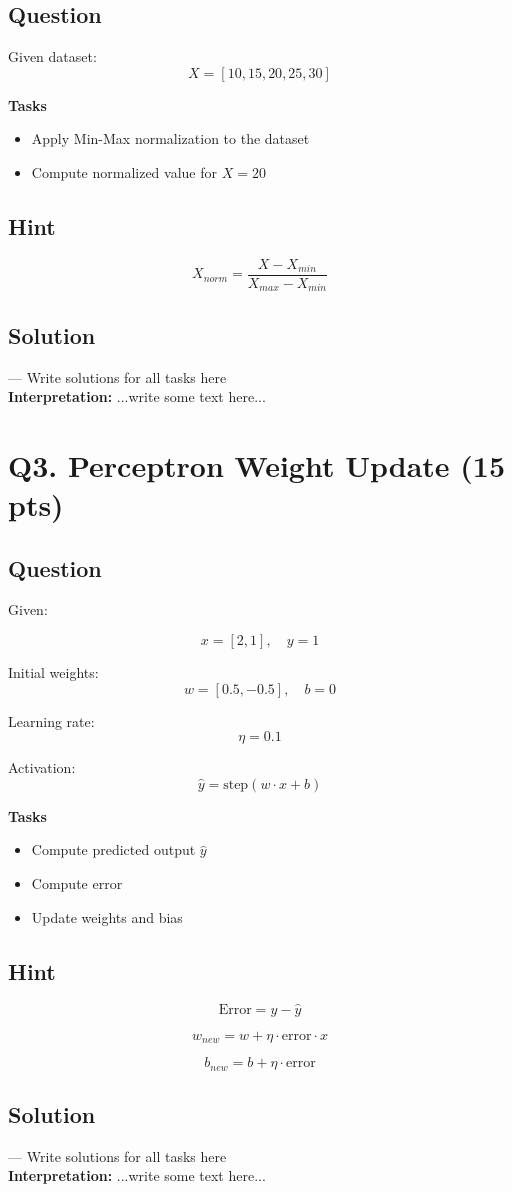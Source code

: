 \documentclass[11pt]{article}
\begin{document}
\subsection*{Question}

Given dataset:
\[
X = [10, 15, 20, 25, 30]
\]

\textbf{Tasks}
\begin{itemize}
    \item Apply Min-Max normalization to the dataset
    \item Compute normalized value for $X = 20$
\end{itemize}

\subsection*{Hint}

\[
X_{norm} = \frac{X - X_{min}}{X_{max} - X_{min}}
\]

\subsection*{Solution}

--- Write solutions for all tasks here \\

\textbf{Interpretation:} ...write some text here...

\section*{Q3. Perceptron Weight Update (15 pts)}

\subsection*{Question}

Given:

\[
x = [2, 1], \quad y = 1
\]

Initial weights:
\[
w = [0.5, -0.5], \quad b = 0
\]

Learning rate:
\[
\eta = 0.1
\]

Activation:
\[
\hat{y} = \text{step}(w \cdot x + b)
\]

\textbf{Tasks}
\begin{itemize}
    \item Compute predicted output $\hat{y}$
    \item Compute error
    \item Update weights and bias
\end{itemize}

\subsection*{Hint}

\[
\text{Error} = y - \hat{y}
\]

\[
w_{new} = w + \eta \cdot \text{error} \cdot x
\]

\[
b_{new} = b + \eta \cdot \text{error}
\]

\subsection*{Solution}

--- Write solutions for all tasks here \\

\textbf{Interpretation:} ...write some text here...
\end{document}
